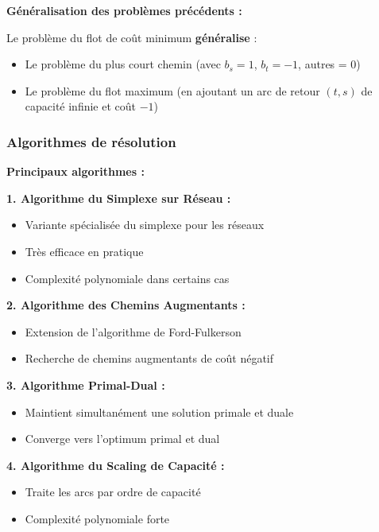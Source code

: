 \documentclass[12pt,a4paper]{article}
\begin{document}
\begin{important}
\textbf{Généralisation des problèmes précédents :}

Le problème du flot de coût minimum \textcolor{titrebleu}{\textbf{généralise}} :
\begin{itemize}
    \item Le problème du plus court chemin (avec $b_s = 1$, $b_t = -1$, autres = 0)
    \item Le problème du flot maximum (en ajoutant un arc de retour $(t,s)$ de capacité infinie et coût $-1$)
\end{itemize}
\end{important}

\subsubsection{Algorithmes de résolution}

\begin{algorithme}
\textbf{Principaux algorithmes :}

\textbf{1. Algorithme du Simplexe sur Réseau :}
\begin{itemize}
    \item Variante spécialisée du simplexe pour les réseaux
    \item Très efficace en pratique
    \item Complexité polynomiale dans certains cas
\end{itemize}

\textbf{2. Algorithme des Chemins Augmentants :}
\begin{itemize}
    \item Extension de l'algorithme de Ford-Fulkerson
    \item Recherche de chemins augmentants de coût négatif
\end{itemize}

\textbf{3. Algorithme Primal-Dual :}
\begin{itemize}
    \item Maintient simultanément une solution primale et duale
    \item Converge vers l'optimum primal et dual
\end{itemize}

\textbf{4. Algorithme du Scaling de Capacité :}
\begin{itemize}
    \item Traite les arcs par ordre de capacité
    \item Complexité polynomiale forte
\end{itemize}
\end{algorithme}
\end{document}

